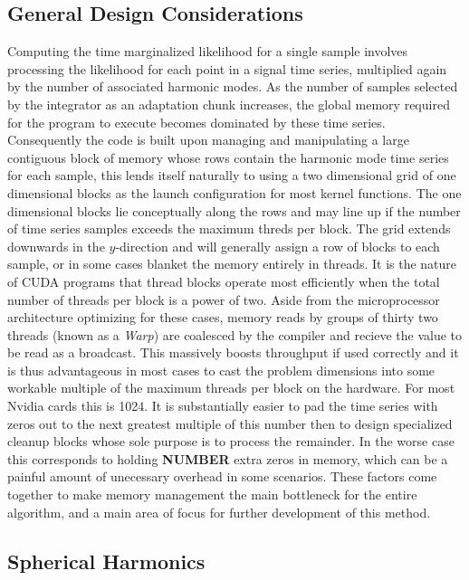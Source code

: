 \documentclass[paper=a4, fontsize=11pt]{scrartcl} %
\numberwithin{equation}{section} %
\numberwithin{figure}{section} %
\numberwithin{table}{section} %
\begin{document}
\subsection{General Design Considerations}
Computing the time marginalized likelihood for a single sample involves processing the likelihood for each point in a signal time series, multiplied again by the number of associated harmonic modes. As the number of samples selected by the integrator as an adaptation chunk increases, the global memory required for the program to execute becomes dominated by these time series. Consequently the code is built upon managing and manipulating a large contiguous block of memory whose rows contain the harmonic mode time series for each sample, this lends itself naturally to using a two dimensional grid of one dimensional blocks as the launch configuration for most kernel functions. The one dimensional blocks lie conceptually along the rows and may line up if the number of time series samples exceeds the maximum threds per block. The grid extends downwards in the $y$-direction and will generally assign a row of blocks to each sample, or in some cases blanket the memory entirely in threads.
It is the nature of CUDA programs that thread blocks operate most efficiently when the total number of threads per block is a power of two. Aside from the microprocessor architecture optimizing for these cases, memory reads by groups of thirty two threads (known as a \textit{Warp}) are coalesced by the compiler and recieve the value to be read as a broadcast. This massively boosts throughput if used correctly and it is thus advantageous in most cases to cast the problem dimensions into some workable multiple of the maximum threads per block on the hardware. For most Nvidia cards this is 1024. It is substantially easier to pad the time series with zeros out to the next greatest multiple of this number then to design specialized cleanup blocks whose sole purpose is to process the remainder. In the worse case this corresponds to holding \textbf{NUMBER} extra zeros in memory, which can be a painful amount of unecessary overhead in some scenarios. These factors come together to make memory management the main bottleneck for the entire algorithm, and a main area of focus for further development of this method.      

\subsection{Spherical Harmonics}
\end{document}
